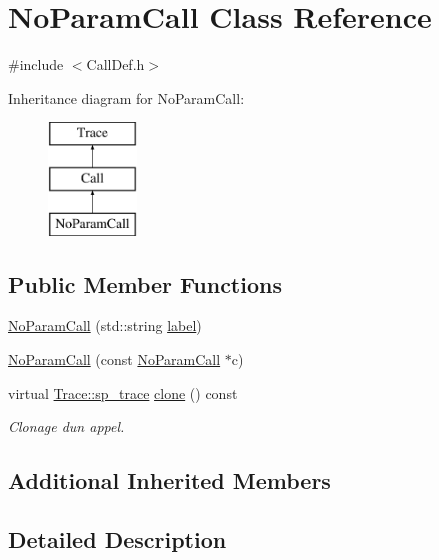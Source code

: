 \hypertarget{class_no_param_call}{}\section{No\+Param\+Call Class Reference}
\label{class_no_param_call}


{\ttfamily \#include $<$Call\+Def.\+h$>$}

Inheritance diagram for No\+Param\+Call\+:\begin{figure}[H]
\begin{center}
\leavevmode
\includegraphics[height=3.000000cm]{class_no_param_call}
\end{center}
\end{figure}
\subsection*{Public Member Functions}
\begin{DoxyCompactItemize}
\item 
\hyperlink{class_no_param_call_a8ddb088ba749768c4fc3df01f0c35fa1}{No\+Param\+Call} (std\+::string \hyperlink{class_call_ad6b8343d530798fdb48407b3f2489ae7}{label})
\item 
\hyperlink{class_no_param_call_ae4e6dcc8a8705c578cac1acc045c7886}{No\+Param\+Call} (const \hyperlink{class_no_param_call}{No\+Param\+Call} $\ast$c)
\item 
virtual \hyperlink{class_trace_a9c58e523529fc8a03fb6acf3eef86150}{Trace\+::sp\+\_\+trace} \hyperlink{class_no_param_call_a8488a6947c974711af12b10f89298bf8}{clone} () const 
\begin{DoxyCompactList}\small\item\em Clonage d\textquotesingle{}un appel. \end{DoxyCompactList}\end{DoxyCompactItemize}
\subsection*{Additional Inherited Members}


\subsection{Detailed Description}


